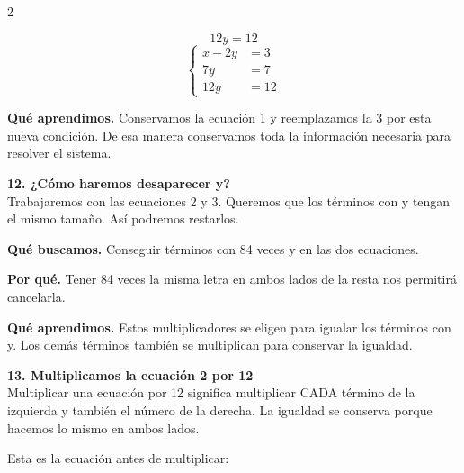 \documentclass[11pt,a4paper,landscape]{article}
\begin{document}
\begin{multicols*}{2}
\begin{minipage}{\linewidth}
\[12y = 12\]
\[\left\{\begin{aligned}x - 2y &= 3\\7y &= 7\\12y &= 12\end{aligned}\right.\]
\par\smallskip\textbf{Qué aprendimos.} Conservamos la ecuación 1 y reemplazamos la 3 por esta nueva condición. De esa manera conservamos toda la información necesaria para resolver el sistema.
\end{minipage}\par\medskip
\noindent\begin{minipage}{\linewidth}\textbf{12. ¿Cómo haremos desaparecer y?}\\[2pt]Trabajaremos con las ecuaciones 2 y 3. Queremos que los términos con y tengan el mismo tamaño. Así podremos restarlos.
\par\smallskip\textbf{Qué buscamos.} Conseguir términos con 84 veces y en las dos ecuaciones.
\par\smallskip\textbf{Por qué.} Tener 84 veces la misma letra en ambos lados de la resta nos permitirá cancelarla.
\par{}\par\smallskip
\par\smallskip\textbf{Qué aprendimos.} Estos multiplicadores se eligen para igualar los términos con y. Los demás términos también se multiplican para conservar la igualdad.
\end{minipage}\par\medskip
\noindent\begin{minipage}{\linewidth}\textbf{13. Multiplicamos la ecuación 2 por 12}\\[2pt]Multiplicar una ecuación por 12 significa multiplicar CADA término de la izquierda y también el número de la derecha. La igualdad se conserva porque hacemos lo mismo en ambos lados.
\par\smallskip Esta es la ecuación antes de multiplicar:

\end{minipage}
\end{multicols*}
\end{document}
